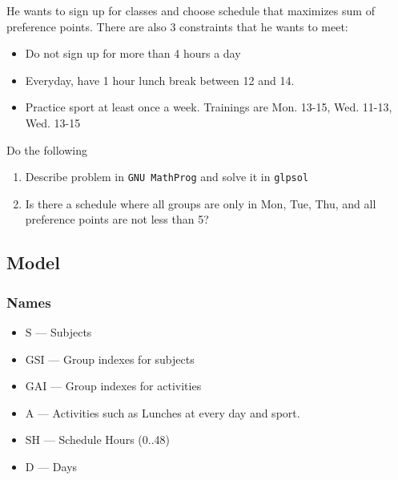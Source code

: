 He wants to sign up for classes and choose schedule that maximizes sum of preference points.
There are also 3 constraints that he wants to meet:
\begin{itemize}
    \item Do not sign up for more than 4 hours a day
    \item Everyday, have 1 hour lunch break between 12 and 14.
    \item Practice sport at least once a week. Trainings are Mon. 13-15, Wed. 11-13, Wed. 13-15
\end{itemize}

Do the following
\begin{enumerate}
    \item Describe problem in \texttt{GNU MathProg} and solve it in \texttt{glpsol} \notdone
    \item Is there a schedule where all groups are only in Mon, Tue, Thu, and all preference points are not less than 5? \notdone
\end{enumerate}
   
\subsection{Model}
\subsubsection*{Names}
\begin{itemize}
    \item $\textrm{S}$ --- Subjects
    \item $\textrm{GSI}$ --- Group indexes for subjects
    \item $\textrm{GAI}$ --- Group indexes for activities
    \item $\textrm{A}$ --- Activities such as Lunches at every day and sport.
    \item $\textrm{SH}$ --- Schedule Hours (0..48)
    \item $\textrm{D}$ --- Days
\end{itemize}
